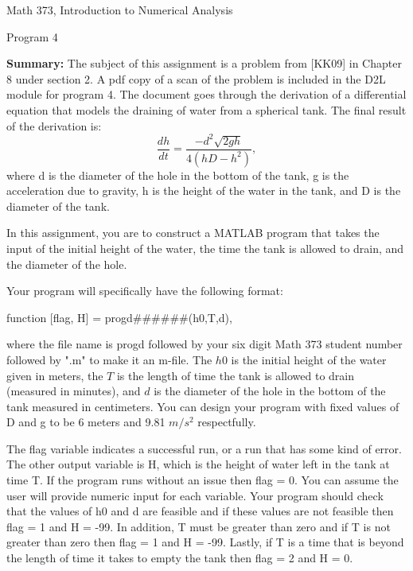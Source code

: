 \documentclass{article}
\renewcommand{\cite}[1]{[#1]}
\def\ds{\displaystyle}
\begin{document}

\large

{\Large Math 373, Introduction to Numerical Analysis}


{\Large Program 4} \par \medskip \noindent
%
{\bf Summary:} The subject of this assignment is a problem from \cite{KK09} in Chapter 8 under section 2. A pdf copy of a scan of the problem is included in the D2L module for program 4. The document goes through the derivation of a differential equation that models the draining of water from a spherical tank. The final result of the derivation is:
\begin{equation}
\frac {dh}{dt} = \frac {-d^2 \sqrt{2gh}}{4(hD-h^2)},
\label{e:drain_ode}
\end{equation}
where d is the diameter of the hole in the bottom of the tank, g is the acceleration due to gravity, h is the height of the water in the tank, and D is the diameter of the tank. 
\par \bigskip \par \noindent
In this assignment, you are to construct a MATLAB program that takes the input of the initial height of the water, the time the tank is allowed to drain, and the diameter of the hole. 


Your program will specifically have the following format: \par \medskip
function [flag, H] = progd\#\#\#\#\#\#(h0,T,d), \par \medskip \noindent
%
where the file name is progd followed by your six digit Math 373 student number  followed by ".m" to make it an m-file. The $h0$ is the initial height of the water given in meters, the $T$ is the length of time the tank is allowed to drain (measured in minutes), and $d$ is the diameter of the hole in the bottom of the tank measured in centimeters. You can design your program with fixed values of D and g to be 6 meters and 9.81 $\ds m/s^2$ respectfully. 

The flag variable indicates a successful run, or a run that has some kind of error. The other output variable is H, which is the height of water left in the tank at time T. If the program runs without an issue then flag = 0. You can assume the user will provide numeric input for each variable. Your program should check that the values of h0 and d are feasible and if these values are not feasible then flag = 1 and H = -99. In addition, T must be greater than zero and if T is not greater than zero then flag = 1 and H = -99. Lastly, if T is a time that is beyond the length of time it takes to empty the tank then flag = 2 and H = 0. 
\end{document}
